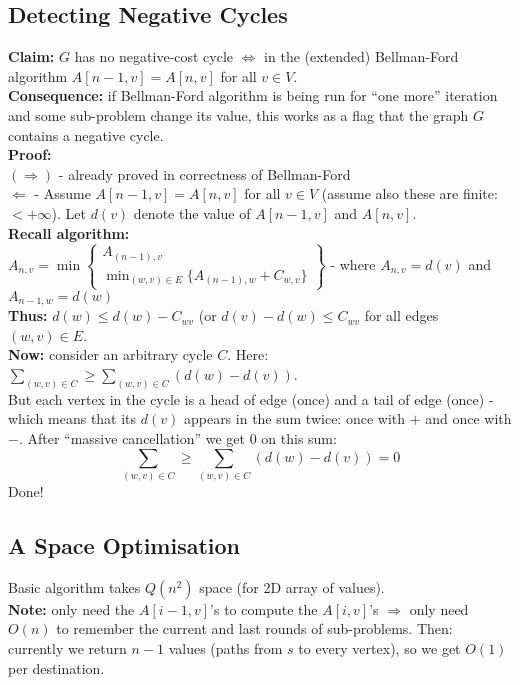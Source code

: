 \documentclass{scrartcl}
\begin{document}
\subsection{Detecting Negative Cycles}
\label{sec:14-5} {\bf Claim: } $G$ has no negative-cost cycle $\Leftrightarrow$
in the (extended)
Bellman-Ford algorithm $A[n-1, v] = A[n,v]$ for all $v \in V$.\\
{\bf Consequence: } if Bellman-Ford algorithm is being run for ``one more''
iteration and some sub-problem change its value, this works as a flag that the
graph $G$ contains a negative cycle.\\
{\bf Proof: } \\
$(\Rightarrow)$ - already proved in correctness of Bellman-Ford\\
$\Leftarrow$ - Assume $A[n-1, v] = A[n, v]$ for all $v \in V$ (assume also these
are finite: $< +\infty$). Let $d(v)$ denote the value of $A[n-1, v]$ and $A[n,
v]$.\\
{\bf Recall algorithm: }\\
$A_{n, v} = \min \left\{\begin{smallmatrix} A_{(n-1), v} \\ \min_{(w, v) \in E}
    \{A_{(n-1), w} + C_{w, v} \} \end{smallmatrix} \right\} $ - where $A_{n, v}
= d(v)$ and $A_{n-1, w} = d(w)$ \\
{\bf Thus: } $d(w) \leq d(w) - C_{wv}$ (or $d(v) - d(w) \leq C_{wv}$ for all
edges $(w, v) \in E$.\\
{\bf Now: } consider an arbitrary cycle $C$. Here:$\sum \limits_{(w, v) \in C}
\geq \sum \limits_{(w, v) \in C} (d(w) - d(v))$.\\
But each vertex in the cycle is a head of edge (once) and a tail of edge (once)
- which means that its $d(v)$ appears in the sum twice: once with $+$ and once
with $-$. After ``massive cancellation'' we get 0 on this sum:
$$\sum \limits_{(w, v) \in C} \geq \sum \limits_{(w, v) \in C} (d(w) - d(v)) = 0$$
Done!

\subsection{A Space Optimisation}
\label{sec:14-6}
Basic algorithm takes $Q(n^2)$ space (for 2D array of values).\\
{\bf Note: } only need the $A[i-1, v]$'s to compute the $A[i, v]$'s
$\Rightarrow$ only need $O(n)$ to remember the current and last rounds of
sub-problems. Then: currently we return $n-1$ values (paths from $s$ to every
vertex), so we
get $O(1)$ per destination.\\
\end{document}

